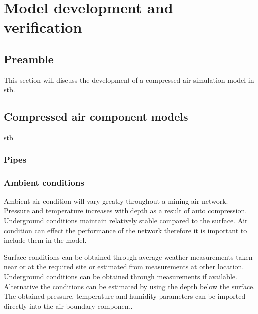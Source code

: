 \section{Model development and verification}
	\subsection{Preamble}
	This section will discuss the development of a compressed air simulation model in \gls{stb}.
	\subsection{Compressed air component models}
		\gls{stb} 
		\subsubsection{Pipes}
		\subsubsection{Ambient conditions}
		Ambient air condition will vary greatly throughout a mining air network. Pressure and temperature increases with depth  as a result of auto compression. Underground conditions maintain relatively stable compared to the surface. Air condition can effect the performance of the network therefore it is important to include them in the model.
		\par 
		Surface conditions can be obtained through average weather measurements taken near or at the required site or estimated from measurements at other location. Underground conditions can be obtained through measurements if available. Alternative the conditions can be estimated by using the depth below the surface. The obtained pressure, temperature and humidity parameters can be imported directly into the air boundary component.
